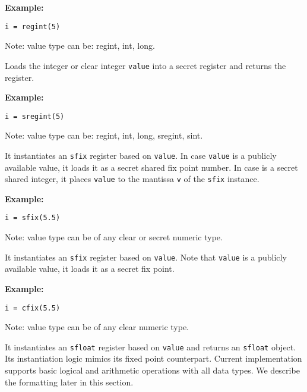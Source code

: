 \noindent
\textbf{Example:}
\begin{lstlisting}
i = regint(5)
\end{lstlisting}
\begin{footnotesize}
  Note: value type can be: regint, int, long.
\end{footnotesize}

Loads the integer or clear integer \verb|value| into a secret register and returns the register.

\noindent
\textbf{Example:}
\begin{lstlisting}
i = sregint(5)
\end{lstlisting}
\begin{footnotesize}
  Note: value type can be: regint, int, long, sregint, sint.
\end{footnotesize}

It instantiates  an \verb|sfix| register based on \verb|value|. In case \verb|value| is a publicly available value, it loads it as a secret shared fix point number. In case is a secret shared integer, it places \verb|value| to the mantissa \verb|v| of the \verb|sfix| instance.

\noindent
\textbf{Example:}
\begin{lstlisting}
i = sfix(5.5)
\end{lstlisting}
\begin{footnotesize}
  Note: value type can be of any clear or secret numeric type.
\end{footnotesize}

It instantiates  an \verb|sfix| register based on \verb|value|.
Note that \verb|value| is a publicly available value, it loads it as a secret fix point.

\noindent
\textbf{Example:}
\begin{lstlisting}
i = cfix(5.5)
\end{lstlisting}
\begin{footnotesize}
  Note: value type can be of any clear numeric type.
\end{footnotesize}


It instantiates  an \verb|sfloat| register based on \verb|value| and returns an \verb|sfloat| object.
Its instantiation logic mimics its fixed point counterpart.
Current implementation supports basic logical and arithmetic operations with all data types.
We describe the formatting later in this section.

